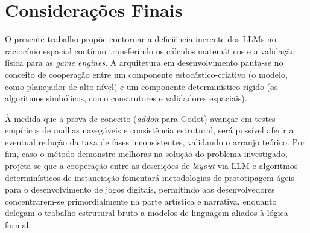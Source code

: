 \section{Considerações Finais}

O presente trabalho propõe contornar a deficiência inerente dos LLMs no raciocínio espacial contínuo transferindo os cálculos matemáticos e a validação física para as \textit{game engines}. A arquitetura em desenvolvimento pauta-se no conceito de cooperação entre um componente estocástico-criativo (o modelo, como planejador de alto nível) e um componente determinístico-rígido (os algoritmos simbólicos, como construtores e validadores espaciais). 

À medida que a prova de conceito (\textit{addon} para Godot) avançar em testes empíricos de malhas navegáveis e consistência estrutural, será possível aferir a eventual redução da taxa de fases inconsistentes, validando o arranjo teórico. Por fim, caso o método demonstre melhoras na solução do problema investigado, projeta-se que a cooperação entre as descrições de \textit{layout} via LLM e algoritmos determinísticos de instanciação fomentará metodologias de prototipagem ágeis para o desenvolvimento de jogos digitais, permitindo aos desenvolvedores concentrarem-se primordialmente na parte artística e narrativa, enquanto delegam o trabalho estrutural bruto a modelos de linguagem aliados à lógica formal.
